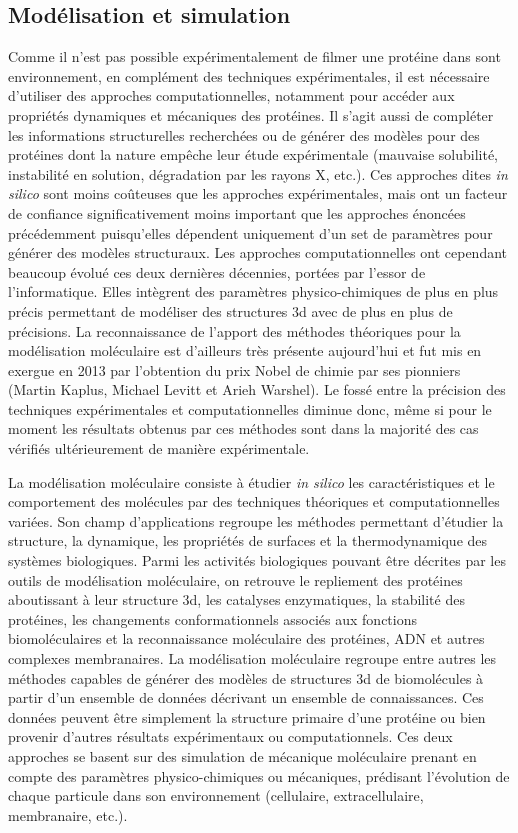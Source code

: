 \subsection{Modélisation et simulation} \label{model_simu}

Comme il n'est pas possible expérimentalement de filmer une protéine dans sont environnement, en complément des techniques expérimentales, il est nécessaire d'utiliser des approches computationnelles, notamment pour accéder aux propriétés dynamiques et mécaniques des protéines. Il s'agit aussi de compléter les informations structurelles recherchées ou de générer des modèles pour des protéines dont la nature empêche leur étude expérimentale (mauvaise solubilité, instabilité en solution, dégradation par les rayons X, etc.). Ces approches dites \textit{in silico} sont moins coûteuses que les approches expérimentales, mais ont un facteur de confiance significativement moins important que les approches énoncées précédemment puisqu'elles dépendent uniquement d'un set de paramètres pour générer des modèles structuraux. Les approches computationnelles ont cependant beaucoup évolué ces deux dernières décennies, portées par l'essor de l'informatique. Elles intègrent des paramètres physico-chimiques de plus en plus précis permettant de modéliser des structures 3d avec de plus en plus de précisions. La reconnaissance de l'apport des méthodes théoriques pour la modélisation moléculaire est d'ailleurs très présente aujourd'hui et fut mis en exergue en 2013 par l'obtention du prix Nobel de chimie par ses pionniers (Martin Kaplus, Michael Levitt et Arieh Warshel)\cite{_nobel_2013}.
Le fossé entre la précision des techniques expérimentales et computationnelles diminue donc, même si pour le moment les résultats obtenus par ces méthodes sont dans la majorité des cas vérifiés ultérieurement de manière expérimentale.

La modélisation moléculaire consiste à étudier \textit{in silico} les caractéristiques et le comportement des molécules par des techniques théoriques et computationnelles variées. Son champ d'applications regroupe les méthodes permettant d'étudier la structure, la dynamique, les propriétés de surfaces et la thermodynamique des systèmes biologiques. Parmi les activités biologiques pouvant être décrites par les outils de modélisation moléculaire, on retrouve le repliement des protéines aboutissant à leur structure 3d, les catalyses enzymatiques, la stabilité des protéines, les changements conformationnels associés aux fonctions biomoléculaires et la reconnaissance moléculaire des protéines, ADN et autres complexes membranaires.
La modélisation moléculaire regroupe entre autres les méthodes capables de générer des modèles de structures 3d de biomolécules à partir d'un ensemble de données décrivant un ensemble de connaissances. Ces données peuvent être simplement la structure primaire d'une protéine ou bien provenir d'autres résultats expérimentaux ou computationnels. Ces deux approches se basent sur des simulation de mécanique moléculaire prenant en compte des paramètres physico-chimiques ou mécaniques, prédisant l'évolution de chaque particule dans son environnement (cellulaire, extracellulaire, membranaire, etc.). 



